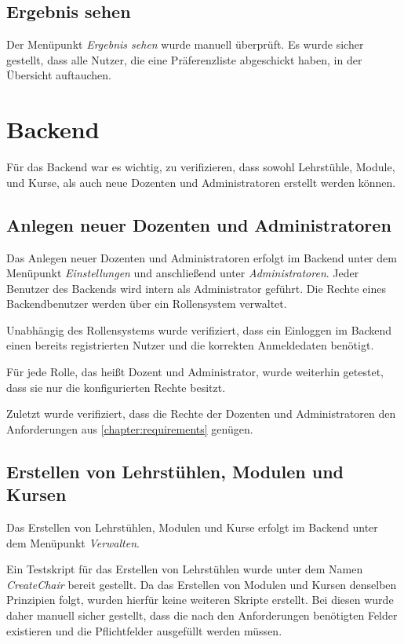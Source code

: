 		\subsection{Ergebnis sehen}
			Der Menüpunkt \textit{Ergebnis sehen} wurde manuell überprüft.
			Es wurde sicher gestellt, dass alle Nutzer, die eine Präferenzliste abgeschickt haben, in der Übersicht auftauchen.
		
	\section{Backend}
	
		Für das Backend war es wichtig, zu verifizieren, dass sowohl Lehrstühle, Module, und Kurse, als auch neue Dozenten und Administratoren erstellt werden können.
			
		\subsection{Anlegen neuer Dozenten und Administratoren}
		
			Das Anlegen neuer Dozenten und Administratoren erfolgt im Backend unter dem Menüpunkt \textit{Einstellungen} und anschließend unter \textit{Administratoren}.
			Jeder Benutzer des Backends wird intern als Administrator geführt.
			Die Rechte eines Backendbenutzer werden über ein Rollensystem verwaltet.
            
			Unabhängig des Rollensystems wurde verifiziert, dass ein Einloggen im Backend einen bereits registrierten Nutzer und die korrekten Anmeldedaten benötigt.
            
			Für jede Rolle, das heißt Dozent und Administrator, wurde weiterhin getestet, dass sie nur die konfigurierten Rechte besitzt.
            
			Zuletzt wurde verifiziert, dass die Rechte der Dozenten und Administratoren den Anforderungen aus \ref{chapter:requirements} genügen.
			
		\subsection{Erstellen von Lehrstühlen, Modulen und Kursen}
			
			Das Erstellen von Lehrstühlen, Modulen und Kurse erfolgt im Backend unter dem Menüpunkt \textit{Verwalten}.
            
			Ein Testskript für das Erstellen von Lehrstühlen wurde unter dem Namen \textit{CreateChair} bereit gestellt.
			Da das Erstellen von Modulen und Kursen denselben Prinzipien folgt, wurden hierfür keine weiteren Skripte erstellt.
			Bei diesen wurde daher manuell sicher gestellt, dass die nach den Anforderungen benötigten Felder existieren und die Pflichtfelder ausgefüllt werden müssen.
            
